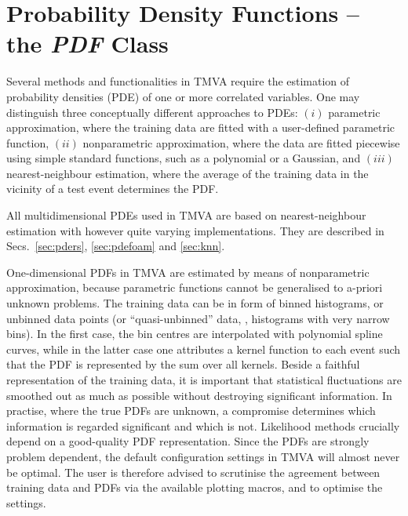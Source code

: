 \section{Probability Density Functions -- the {\em PDF} Class}
\label{sec:PDF}

Several methods and functionalities in TMVA require the estimation of probability densities
(PDE) of one or more correlated variables. One may distinguish three conceptually different 
approaches to PDEs: $(i)$ parametric approximation, where the training data are fitted with 
a user-defined parametric function, $(ii)$ nonparametric approximation, where the data 
are fitted piecewise using simple standard functions, such as a polynomial or a Gaussian, and
$(iii)$ nearest-neighbour estimation, where the average of the training data in the 
vicinity of a test event determines the PDF. 

All multidimensional PDEs used in TMVA are based on nearest-neighbour estimation with 
however quite varying implementations. They are described in Secs.~\ref{sec:pders}, 
\ref{sec:pdefoam} and \ref{sec:knn}. 

One-dimensional PDFs in TMVA are estimated by means 
of nonparametric approximation, because parametric functions cannot be generalised to 
a-priori unknown problems. The training data can be in form of binned histograms, or 
unbinned data points (or ``quasi-unbinned'' data, \ie, histograms with very narrow 
bins). In the first case, the bin centres are interpolated with polynomial
spline curves, while in the latter case one attributes a kernel function
to each event such that the PDF is represented by the sum over all kernels. Beside a faithful
representation of the training data, it is important that statistical fluctuations 
are smoothed out as much as possible without destroying significant information. In 
practise, where the true PDFs are unknown, a compromise determines which information
is regarded significant and which is not. Likelihood methods crucially depend on a 
good-quality PDF representation. Since the PDFs are strongly problem dependent, the 
default configuration settings in TMVA will almost never be optimal. The user is 
therefore advised to scrutinise the agreement between training data and PDFs via the 
available plotting macros, and to optimise the settings. 

